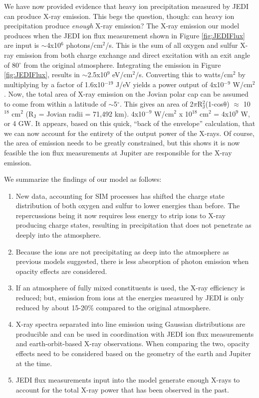 \documentclass[draft]{agujournal2018}
\begin{document}
We have now provided evidence that heavy ion precipitation measured by JEDI can produce X-ray emission.
This begs the question, though: can heavy ion precipitation produce \textit{enough} X-ray emission?
The X-ray emission our model produces when the JEDI ion flux measurement shown in Figure \ref{fig:JEDIFlux} are input is $\sim$4x10$^6$ photons/cm$^2$/s.
This is the sum of all oxygen and sulfur X-ray emission from both charge exchange and direct excitation with an exit angle of 80$^{\circ}$ from the original atmosphere.
Integrating the emission in Figure \ref{fig:JEDIFlux}, results in $\sim$2.5x10$^9$ eV/cm$^2$/s.
Converting this to watts/cm$^2$ by multiplying by a factor of 1.6x10$^{-19}$ J/eV yields a power output of 4x10$^{-9}$ W/cm$^2$.
Now, the total area of X-ray emission on the Jovian polar cap can be assumed to come from within a latitude of $\sim$5$^{\circ}$.
This gives an area of 2$\pi$R$_{\mathrm{J}}^2$(1-cos$\mathrm{\theta}$) $\approx$ 10$^{18}$ cm$^2$ (R$_{\mathrm{J}}$ = Jovian radii = 71,492 km).
4x10$^{-9}$ W/cm$^2$ x 10$^{18}$ cm$^2$ = 4x10$^9$ W, or 4 GW.
It appears, based on this quick, ``back of the envelope'' calculation, that we can now account for the entirety of the output power of the X-rays.
Of course, the area of emission needs to be greatly constrained, but this shows it is now feasible the ion flux measurements at Jupiter are responsible for the X-ray emission.

We summarize the findings of our model as follows:
\begin{enumerate}
    \item New data, accounting for SIM processes has shifted the charge state distribution of both oxygen and sulfur to lower energies than before.
    The repercussions being it now requires less energy to strip ions to X-ray producing charge states, resulting in precipitation that does not penetrate as deeply into the atmosphere.
    \item Because the ions are not precipitating as deep into the atmosphere as previous models suggested, there is less absorption of photon emission when opacity effects are considered.
    \item If an atmosphere of fully mixed constituents is used, the X-ray efficiency is reduced; but, emission from ions at the energies measured by JEDI is only reduced by about 15-20$\%$ compared to the original atmosphere.
    \item X-ray spectra separated into line emission using Gaussian distributions are producible and can be used in coordination with JEDI ion flux measurements and earth-orbit-based X-ray observations.
    When comparing the two, opacity effects need to be considered based on the geometry of the earth and Jupiter at the time.
    \item JEDI flux measurements input into the model generate enough X-rays to account for the total X-ray power that has been observed in the past.
\end{enumerate}
\end{document}

